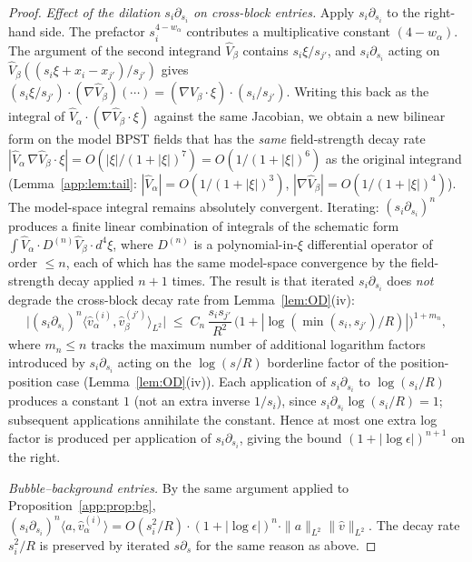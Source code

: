 \documentclass[11pt,letterpaper]{article}
\theoremstyle{definition}
\begin{document}
\begin{proof}
\emph{Effect of the dilation $s_i\partial_{s_i}$ on cross-block entries.}
Apply $s_i\partial_{s_i}$ to the right-hand side. The prefactor $s_i^{4-w_\alpha}$ contributes a multiplicative constant $(4-w_\alpha)$. The argument of the second integrand $\hat V_\beta$ contains $s_i\xi/s_{j'}$, and $s_i\partial_{s_i}$ acting on $\hat V_\beta((s_i\xi + x_i-x_{j'})/s_{j'})$ gives $(s_i\xi/s_{j'})\cdot (\nabla \hat V_\beta)(\cdots) = (\nabla\hat V_\beta\cdot\xi)\cdot(s_i/s_{j'})$. Writing this back as the integral of $\hat V_\alpha\cdot (\nabla\hat V_\beta\cdot\xi)$ against the same Jacobian, we obtain a new bilinear form on the model BPST fields that has the \emph{same} field-strength decay rate $|\hat V_\alpha\,\nabla\hat V_\beta\cdot\xi| = O(|\xi|/(1+|\xi|)^7) = O(1/(1+|\xi|)^6)$ as the original integrand (Lemma~\ref{app:lem:tail}: $|\hat V_\alpha| = O(1/(1+|\xi|)^3)$, $|\nabla\hat V_\beta| = O(1/(1+|\xi|)^4)$). The model-space integral remains absolutely convergent. Iterating: $(s_i\partial_{s_i})^n$ produces a finite linear combination of integrals of the schematic form $\int \hat V_\alpha \cdot D^{(n)}\hat V_\beta\cdot d^4\xi$, where $D^{(n)}$ is a polynomial-in-$\xi$ differential operator of order $\le n$, each of which has the same model-space convergence by the field-strength decay applied $n+1$ times. The result is that iterated $s_i\partial_{s_i}$ does \emph{not} degrade the cross-block decay rate from Lemma~\ref{lem:OD}(iv):
\begin{equation}\label{eq:iterated-scale-derivative-cross}
\bigl|(s_i\partial_{s_i})^n \langle\hat v_\alpha^{(i)},\hat v_\beta^{(j')}\rangle_{L^2}\bigr| \;\le\; C_n\,\frac{s_i s_{j'}}{R^2}\,\bigl(1+|\log(\min(s_i,s_{j'})/R)|\bigr)^{1+m_n},
\end{equation}
where $m_n \le n$ tracks the maximum number of additional logarithm factors introduced by $s_i\partial_{s_i}$ acting on the $\log(s/R)$ borderline factor of the position-position case (Lemma~\ref{lem:OD}(iv)). Each application of $s_i\partial_{s_i}$ to $\log(s_i/R)$ produces a constant $1$ (not an extra inverse $1/s_i$), since $s_i\partial_{s_i}\log(s_i/R) = 1$; subsequent applications annihilate the constant. Hence at most one extra log factor is produced per application of $s_i\partial_{s_i}$, giving the bound $(1+|\log\epsilon|)^{n+1}$ on the right.

\emph{Bubble--background entries.} By the same argument applied to Proposition~\ref{app:prop:bg}, $(s_i\partial_{s_i})^n\langle a, \hat v_\alpha^{(i)}\rangle = O(s_i^2/R)\cdot (1+|\log\epsilon|)^n\cdot \|a\|_{L^2}\|\hat v\|_{L^2}$. The decay rate $s_i^2/R$ is preserved by iterated $s\partial_s$ for the same reason as above.


\end{proof}
\end{document}
